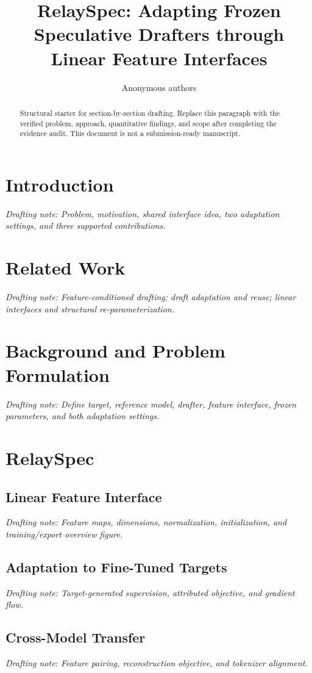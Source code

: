 \documentclass[letterpaper]{article}
\title{RelaySpec: Adapting Frozen Speculative Drafters through Linear Feature Interfaces}
\author{Anonymous authors}
\newcommand{\draftnote}[1]{\par\noindent\textit{Drafting note: #1}\par}
\begin{document}
\maketitle
\begin{abstract}
Structural starter for section-by-section drafting. Replace this paragraph with the verified problem, approach, quantitative findings, and scope after completing the evidence audit. This document is not a submission-ready manuscript.
\end{abstract}

\section{Introduction}
\label{sec:introduction}
\draftnote{Problem, motivation, shared interface idea, two adaptation settings, and three supported contributions.}

\section{Related Work}
\label{sec:related}
\draftnote{Feature-conditioned drafting; draft adaptation and reuse; linear interfaces and structural re-parameterization.}

\section{Background and Problem Formulation}
\label{sec:problem}
\draftnote{Define target, reference model, drafter, feature interface, frozen parameters, and both adaptation settings.}

\section{RelaySpec}
\label{sec:method}
\subsection{Linear Feature Interface}
\draftnote{Feature maps, dimensions, normalization, initialization, and training/export overview figure.}
\subsection{Adaptation to Fine-Tuned Targets}
\draftnote{Target-generated supervision, attributed objective, and gradient flow.}
\subsection{Cross-Model Transfer}
\draftnote{Feature pairing, reconstruction objective, and tokenizer alignment.}
\end{document}
